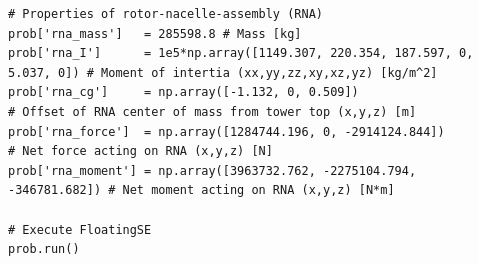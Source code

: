 \begin{lstlisting}
# Properties of rotor-nacelle-assembly (RNA)
prob['rna_mass']   = 285598.8 # Mass [kg]
prob['rna_I']      = 1e5*np.array([1149.307, 220.354, 187.597, 0, 5.037, 0]) # Moment of intertia (xx,yy,zz,xy,xz,yz) [kg/m^2]
prob['rna_cg']     = np.array([-1.132, 0, 0.509])                       # Offset of RNA center of mass from tower top (x,y,z) [m]
prob['rna_force']  = np.array([1284744.196, 0, -2914124.844])           # Net force acting on RNA (x,y,z) [N]
prob['rna_moment'] = np.array([3963732.762, -2275104.794, -346781.682]) # Net moment acting on RNA (x,y,z) [N*m]

# Execute FloatingSE
prob.run()
\end{lstlisting}
